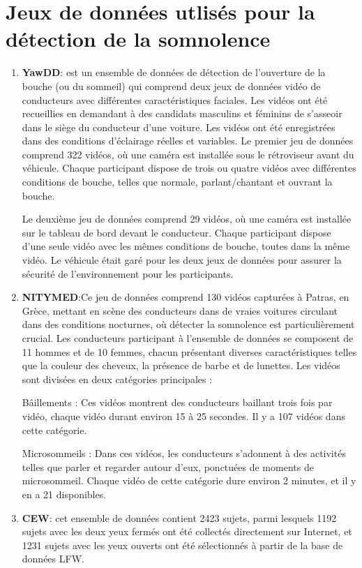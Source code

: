 \section{Jeux de données utlisés pour la détection de la somnolence}
\begin{enumerate}
    \item \textbf{YawDD}: est un ensemble de données de détection de l'ouverture de la bouche (ou du sommeil) qui comprend deux jeux de données vidéo de conducteurs avec différentes caractéristiques faciales. Les vidéos ont été recueillies en demandant à des candidats masculins et féminins de s'asseoir dans le siège du conducteur d'une voiture. Les vidéos ont été enregistrées dans des conditions d'éclairage réelles et variables. 
Le premier jeu de données comprend 322 vidéos, où une caméra est installée sous le rétroviseur avant du véhicule. Chaque participant dispose de trois ou quatre vidéos avec différentes conditions de bouche, telles que normale, parlant/chantant et ouvrant la bouche. 

Le deuxième jeu de données comprend 29 vidéos, où une caméra est installée sur le tableau de bord devant le conducteur. Chaque participant dispose d'une seule vidéo avec les mêmes conditions de bouche, toutes dans la même vidéo. Le véhicule était garé pour les deux jeux de données pour assurer la sécurité de l'environnement pour les participants\cite{inproceedings}.
\item \textbf{NITYMED}:Ce jeu de données comprend 130 vidéos capturées à Patras, en Grèce, mettant en scène des conducteurs dans de vraies voitures circulant dans des conditions nocturnes, où détecter la somnolence est particulièrement crucial. Les conducteurs participant à l'ensemble de données se composent de 11 hommes et de 10 femmes, chacun présentant diverses caractéristiques telles que la couleur des cheveux, la présence de barbe et de lunettes. Les vidéos sont divisées en deux catégories principales :

Bâillements : Ces vidéos montrent des conducteurs baillant trois fois par vidéo, chaque vidéo durant environ 15 à 25 secondes. Il y a 107 vidéos dans cette catégorie.

Microsommeils : Dans ces vidéos, les conducteurs s'adonnent à des activités telles que parler et regarder autour d'eux, ponctuées de moments de microsommeil. Chaque vidéo de cette catégorie dure environ 2 minutes, et il y en a 21 disponibles\cite{nitymed}.
\item \textbf{CEW}:  cet ensemble de données contient 2423 sujets, parmi lesquels 1192 sujets avec les deux yeux fermés ont été collectés directement sur Internet, et 1231 sujets avec les yeux ouverts ont été sélectionnés à partir de la base de données LFW\cite{CEW}.
\end{enumerate}
